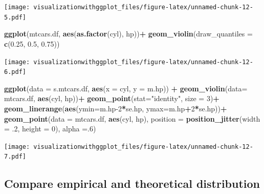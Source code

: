 \documentclass[]{krantz}
\makeatletter
\newenvironment{Shaded}{\begin{snugshade}}{\end{snugshade}}
\newcommand{\DataTypeTok}[1]{\textcolor[rgb]{0.13,0.29,0.53}{#1}}
\newcommand{\DecValTok}[1]{\textcolor[rgb]{0.00,0.00,0.81}{#1}}
\newcommand{\FloatTok}[1]{\textcolor[rgb]{0.00,0.00,0.81}{#1}}
\newcommand{\KeywordTok}[1]{\textcolor[rgb]{0.13,0.29,0.53}{\textbf{#1}}}
\newcommand{\NormalTok}[1]{#1}
\newcommand{\OperatorTok}[1]{\textcolor[rgb]{0.81,0.36,0.00}{\textbf{#1}}}
\newcommand{\StringTok}[1]{\textcolor[rgb]{0.31,0.60,0.02}{#1}}
\newenvironment{kframe}{%
\medskip{}
\setlength{\fboxsep}{.8em}
 \def\at@end@of@kframe{}%
 \ifinner\ifhmode%
  \def\at@end@of@kframe{\end{minipage}}%
  \begin{minipage}{\columnwidth}%
 \fi\fi%
 \def\FrameCommand##1{\hskip\@totalleftmargin \hskip-\fboxsep
 \colorbox{shadecolor}{##1}\hskip-\fboxsep
     \hskip-\linewidth \hskip-\@totalleftmargin \hskip\columnwidth}%
 \MakeFramed {\advance\hsize-\width
   \@totalleftmargin\z@ \linewidth\hsize
   \@setminipage}}%
 {\par\unskip\endMakeFramed%
 \at@end@of@kframe}
\renewenvironment{Shaded}{\begin{kframe}}{\end{kframe}}
\makeatother
\begin{document}
\texttt{[image: visualizationwithggplot\_files/figure-latex/unnamed-chunk-12-5.pdf]}

\begin{Shaded}
\begin{Highlighting}[]
\KeywordTok{ggplot}\NormalTok{(mtcars.df, }\KeywordTok{aes}\NormalTok{(}\KeywordTok{as.factor}\NormalTok{(cyl), hp))}\OperatorTok{+}
\KeywordTok{geom_violin}\NormalTok{(}\DataTypeTok{draw_quantiles =} \KeywordTok{c}\NormalTok{(}\FloatTok{0.25}\NormalTok{, }\FloatTok{0.5}\NormalTok{, }\FloatTok{0.75}\NormalTok{))}
\end{Highlighting}
\end{Shaded}

\texttt{[image: visualizationwithggplot\_files/figure-latex/unnamed-chunk-12-6.pdf]}

\begin{Shaded}
\begin{Highlighting}[]
\KeywordTok{ggplot}\NormalTok{(}\DataTypeTok{data =}\NormalTok{ s.mtcars.df, }\KeywordTok{aes}\NormalTok{(}\DataTypeTok{x =}\NormalTok{ cyl, }\DataTypeTok{y =}\NormalTok{ m.hp)) }\OperatorTok{+}
\StringTok{  }\KeywordTok{geom_violin}\NormalTok{(}\DataTypeTok{data=}\NormalTok{ mtcars.df, }\KeywordTok{aes}\NormalTok{(cyl, hp))}\OperatorTok{+}
\StringTok{  }\KeywordTok{geom_point}\NormalTok{(}\DataTypeTok{stat=}\StringTok{"identity"}\NormalTok{, }\DataTypeTok{size =} \DecValTok{3}\NormalTok{)}\OperatorTok{+}
\StringTok{  }\KeywordTok{geom_linerange}\NormalTok{(}\KeywordTok{aes}\NormalTok{(}\DataTypeTok{ymin=}\NormalTok{m.hp}\DecValTok{-2}\OperatorTok{*}\NormalTok{se.hp, }\DataTypeTok{ymax=}\NormalTok{m.hp}\OperatorTok{+}\DecValTok{2}\OperatorTok{*}\NormalTok{se.hp))}\OperatorTok{+}
\StringTok{  }\KeywordTok{geom_point}\NormalTok{(}\DataTypeTok{data =}\NormalTok{ mtcars.df, }\KeywordTok{aes}\NormalTok{(cyl, hp), }
             \DataTypeTok{position =} \KeywordTok{position_jitter}\NormalTok{(}\DataTypeTok{width =} \FloatTok{.2}\NormalTok{, }\DataTypeTok{height =} \DecValTok{0}\NormalTok{), }\DataTypeTok{alpha =}\NormalTok{.}\DecValTok{6}\NormalTok{)}
\end{Highlighting}
\end{Shaded}

\texttt{[image: visualizationwithggplot\_files/figure-latex/unnamed-chunk-12-7.pdf]}

\hypertarget{compare-empirical-and-theoretical-distribution}{%
\subsection{Compare empirical and theoretical distribution}\label{compare-empirical-and-theoretical-distribution}}
\end{document}
